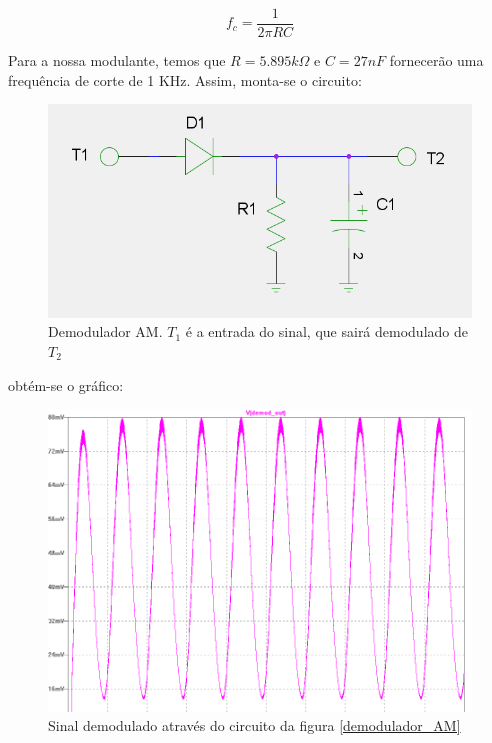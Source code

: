 \documentclass[]{report}
\begin{document}
\begin{equation}
f_c = \frac{1}{2 \pi R C}
\end{equation}

Para a nossa modulante, temos que $R = 5.895 k\Omega$ e $C = 27 nF$ fornecerão uma frequência de corte de  1 KHz. Assim, monta-se o circuito:

\begin{figure}[H]\label{demodulador_AM}
\begin{center}
\includegraphics[scale=0.35]{./imagens/Demodulador_AM}
\caption{Demodulador AM. $T_1$ é a entrada do sinal, que sairá demodulado de $T_2$}
\label{fig:demod_AM}
\end{center}
\end{figure}

obtém-se o gráfico:

\begin{figure}[H]
\begin{center}
\includegraphics[scale=0.24]{./imagens/grafico_demodulada}
\caption{Sinal demodulado através do circuito da figura \ref{demodulador_AM}}
\label{fig:demodulada}
\end{center}
\end{figure}
\end{document}
